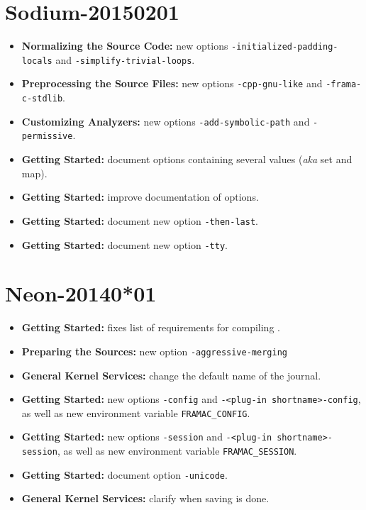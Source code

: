 \section*{Sodium-20150201}
\begin{itemize}
\item \textbf{Normalizing the Source Code:} new options
  \texttt{-initialized-padding-locals} and \texttt{-simplify-trivial-loops}.
\item \textbf{Preprocessing the Source Files:} new options
  \texttt{-cpp-gnu-like} and \texttt{-frama-c-stdlib}.
\item \textbf{Customizing Analyzers:} new options
  \texttt{-add-symbolic-path} and \texttt{-permissive}.
\item \textbf{Getting Started:} document options containing several values
  (\emph{aka} set and map).
\item \textbf{Getting Started:} improve documentation of options.
\item \textbf{Getting Started:} document new option \texttt{-then-last}.
\item \textbf{Getting Started:} document new option \texttt{-tty}.
\end{itemize}

\section*{Neon-20140*01}
\begin{itemize}
\item \textbf{Getting Started:} fixes list of requirements
  for compiling \FramaC.
\item \textbf{Preparing the Sources:} new option \texttt{-aggressive-merging}
\item \textbf{General Kernel Services:} change the default name of the journal.
\item \textbf{Getting Started:}
  new options \texttt{-config} and \texttt{-<plug-in shortname>-config}, as
  well as new environment variable \texttt{FRAMAC\_CONFIG}.
\item \textbf{Getting Started:}
  new options \texttt{-session} and \texttt{-<plug-in shortname>-session}, as
  well as new environment variable \texttt{FRAMAC\_SESSION}.
\item \textbf{Getting Started:} document option \texttt{-unicode}.
\item \textbf{General Kernel Services:} clarify when saving is done.
\end{itemize}

